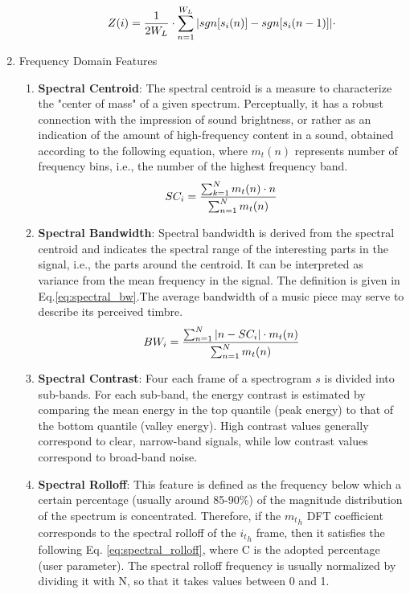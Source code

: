 \documentclass[conference]{IEEEtran}
\begin{document}
\begin{enumerate}
\begin{enumerate}
        \begin{equation}\label{eq:zcr}\small
            Z(i)=\frac{1}{2W_L}\cdot\sum_{n=1}^{W_L} |sgn[s_i(n)]-sgn[s_i(n-1)]|\cdot
        \end{equation}
    \end{enumerate}
    \item Frequency Domain Features
    \begin{enumerate}
        \item\textbf{Spectral Centroid}: The spectral centroid is a measure to characterize the "center of mass" of a given spectrum. Perceptually, it has a robust connection with the impression of sound brightness, or rather as an indication of the amount of high-frequency content in a sound, obtained according to the following equation, where $m_t(n)$ represents number of frequency bins, i.e., the number of the highest frequency band.
        \begin{equation}\label{eq:spectral_centroid}\small
            SC_i=\frac{\sum_{k=1}^{N} m_t(n)\cdot n}{\sum_{n=1}^{N} m_t(n)}
        \end{equation}
        \item\textbf{Spectral Bandwidth}: Spectral bandwidth is derived from the spectral centroid and indicates the spectral range of the interesting parts in the signal, i.e., the parts around the centroid. It can be interpreted as variance from the mean frequency in the signal. The definition is given in Eq.\ref{eq:spectral_bw}.The average bandwidth of a music piece may serve to describe its perceived timbre.\cite{Lerch:1540227}
        \begin{equation}\label{eq:spectral_bw}\small
            BW_i=\frac{\sum_{n=1}^{N} |n-SC_i|\cdot m_t(n)}{\sum_{n=1}^{N} m_t(n)}
        \end{equation}
        \item\textbf{Spectral Contrast}: Four each frame of a spectrogram $s$ is divided into sub-bands. For each sub-band, the energy contrast is estimated by comparing the mean energy in the top quantile (peak energy) to that of the bottom quantile (valley energy). High contrast values generally correspond to clear, narrow-band signals, while low contrast values correspond to broad-band noise.\cite{1035731}
        \item\textbf{Spectral Rolloff}: This feature is defined as the frequency below which a certain percentage (usually around 85-90\%) of the magnitude distribution of the spectrum is concentrated.
        Therefore, if the ${m_t}_h$ DFT coefficient corresponds to the spectral rolloff of the ${i_t}_h$ frame, then it satisfies the following Eq. \ref{eq:spectral_rolloff}, where C is the adopted percentage (user parameter). The spectral rolloff frequency is usually normalized by dividing it with N, so that it takes values between 0 and 1.

\end{enumerate}
\end{enumerate}
\end{document}

